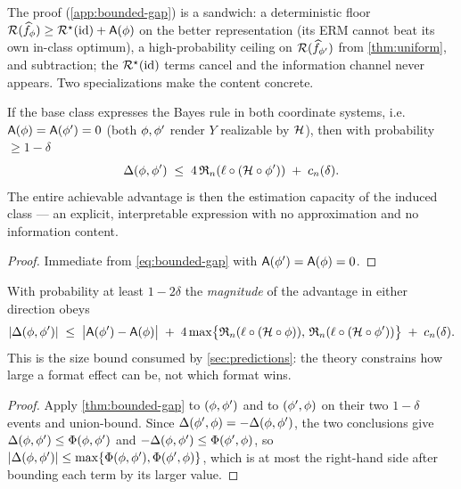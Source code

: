 The proof (\cref{app:bounded-gap}) is a sandwich: a deterministic floor
$\mathcal{R}(\widehat f_{\phi})\ge\mathcal{R}^{\star}(\mathrm{id})+\mathsf{A}(\phi)$ on the
better representation (its ERM cannot beat its own in-class optimum), a
high-probability ceiling on $\mathcal{R}(\widehat f_{\phi'})$ from \cref{thm:uniform},
and subtraction; the $\mathcal{R}^{\star}(\mathrm{id})$ terms cancel and the information
channel never appears. Two specializations make the content concrete.

\begin{corollary}
\label{cor:realizable-gap}
If the base class expresses the Bayes rule in both coordinate systems, i.e.\
$\mathsf{A}(\phi)=\mathsf{A}(\phi')=0$ (both $\phi,\phi'$ render $Y$ realizable
by $\mathcal{H}$), then with probability $\ge 1-\delta$
\begin{equation}
  \label{eq:realizable-gap}
  \Delta(\phi,\phi')\;\le\;4\,\mathfrak{R}_n(\ell\circ(\mathcal{H}\circ\phi'))
    \;+\;c_n(\delta).
\end{equation}
The entire achievable advantage is then the estimation capacity of the induced
class --- an explicit, interpretable expression with no approximation and no
information content.
\end{corollary}

\begin{proof}
Immediate from \eqref{eq:bounded-gap} with $\mathsf{A}(\phi')=\mathsf{A}(\phi)=0$.
\end{proof}

\begin{corollary}
\label{cor:size-gap}
With probability at least $1-2\delta$ the \emph{magnitude} of the advantage in
either direction obeys
\begin{equation}
  \label{eq:size-gap}
  |\Delta(\phi,\phi')|
  \;\le\;
  \big|\mathsf{A}(\phi')-\mathsf{A}(\phi)\big|
  \;+\;
  4\max\!\big\{\mathfrak{R}_n(\ell\circ(\mathcal{H}\circ\phi)),\,\mathfrak{R}_n(\ell\circ(\mathcal{H}\circ\phi'))\big\}
  \;+\;
  c_n(\delta).
\end{equation}
This is the size bound consumed by \cref{sec:predictions}: the theory constrains
how large a format effect can be, not which format wins.
\end{corollary}

\begin{proof}
Apply \cref{thm:bounded-gap} to $(\phi,\phi')$ and to $(\phi',\phi)$ on their two
$1-\delta$ events and union-bound. Since
$\Delta(\phi',\phi)=-\Delta(\phi,\phi')$, the two conclusions give
$\Delta(\phi,\phi')\le\Phi(\phi,\phi')$ and
$-\Delta(\phi,\phi')\le\Phi(\phi',\phi)$, so
$|\Delta(\phi,\phi')|\le\max\{\Phi(\phi,\phi'),\Phi(\phi',\phi)\}$, which is
at most the right-hand side after bounding each term by its larger value.
\end{proof}

